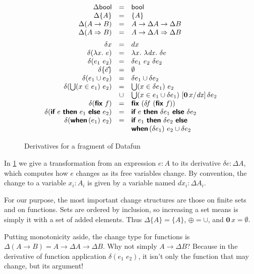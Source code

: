 \documentclass[sigplan,screen,dvipsnames]{acmart}
\newcommand{\D}{\Delta}
\newcommand{\fn}{\lambda}
\newcommand{\binder}{.~}
\newcommand{\bind}[1]{#1\binder}
\newcommand{\fnof}[1]{\fn\bind{#1}}
\renewcommand{\d}{\delta}
\newcommand{\zero}{\mathbf{0}}
\newcommand{\kw}[1]{\textsf{\bfseries #1}}
\newcommand{\var}[1]{\mathit{#1}}
\newcommand{\dee}[1]{\var{d#1}}
\newcommand{\subst}[1]{[#1]\,}
\newcommand{\mto}{\overset{+}{\to}}
\renewcommand{\mto}{\Rightarrow}
\newcommand{\tset}[1]{\{#1\}}
\newcommand{\tbool}{\textsf{bool}}
\newcommand{\eset}[1]{\{#1\}}
\newcommand{\ewhen}[1]{\kw{when}\,(#1)~}
\newcommand{\eif}[2]{\kw{if}~#1~\kw{then}~#2~\kw{else}~}
\newcommand{\efor}[1]{\bigcup(#1)~}
\newcommand{\elet}[1]{\kw{let}~#1~\kw{in}~}
\newcommand{\efix}{\kw{fix}~}
\begin{document}
\begin{figure}
  \[\begin{array}{rcl}
    \D\tbool &=& \tbool\\
    \D\tset{A} &=& \tset{A}\\
    \D(A \to B) &=& A \to \D A \to \D B\\
    \D(A \mto B) &=& A \to \D A \mto \D B
    \vspace{0.5em}\\
    \d x &=& dx\\
    \d(\fnof x e) &=& \fnof x \fnof{\dee x} \d{e}\\
    \d(e_1~e_2) &=& \d{e_1}~e_2~\d{e_2}\\
    \d{\eset{\vec e}} &=& \emptyset\\
    \d(e_1 \cup e_2) &=& \d{e_1} \cup \d{e_2}\\
    \d(\efor{x \in e_1} e_2)
    &=& \efor{x \in \d{e_1}} e_2\\
    &\cup& \efor{x \in e_1 \cup \d{e_1}}
    \subst{\zero\, x / \dee x}
    \d{e_2}
    \\
    \d(\efix f) &=& \efix (\d\!f~(\efix f))\\
    \d(\eif{e}{e_1}{e_2}) &=& \eif{e}{\d{e_1}}{\d{e_2}}\\
    \d(\ewhen{e_1}{e_2})
    &=& \eif{e_1}{\d{e_2}}\\
    && \ewhen{\d{e_1}} {e_2 \cup \d{e_2}}
  \end{array}\]
  \vspace{-.8em}
  \caption{Derivatives for a fragment of Datafun}
  \label{fig:derivatives}
\end{figure}

In \cref{fig:derivatives} we give a transformation from an expression $e : A$ to
its derivative $\d e : \D A$, which computes how $e$ changes as its free
variables change. By convention, the change to a variable $x_i : A_i$ is given
by a variable named $\dee x_i : \D A_i$.

For our purpose, the most important change structures are those on finite sets
and on functions. Sets are ordered by inclusion, so increasing a set means is
simply it with a set of added elements. Thus $\D\tset{A} = \tset{A}$, $\oplus =
\cup$, and $\zero\,x = \emptyset$.

Putting monotonicity aside, the change type for functions is $\D(A \to B) = A
\to \D A \to \D B$. Why not simply $A \to \D B$? Because in the derivative of
function application $\d(e_1\;e_2)$, it isn't only the function that may change,
but its argument!
\end{document}
